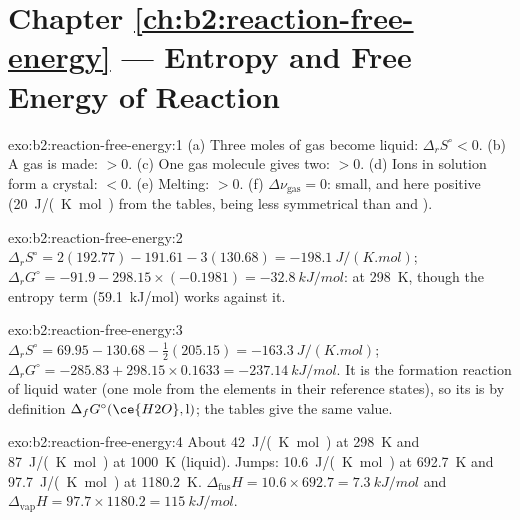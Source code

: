 \section*{Chapter \ref{ch:b2:reaction-free-energy} --- Entropy and Free Energy of Reaction}

\begin{solution}{exo:b2:reaction-free-energy:1}
(a) Three moles of gas become liquid: $\Delta_r S^\circ < 0$. (b) A gas is
made: $> 0$. (c) One gas molecule gives two: $> 0$. (d) Ions in solution
form a crystal: $< 0$. (e) Melting: $> 0$. (f) $\Delta\nu_{\text{gas}} = 0$:
small, and here positive (\qty{+20}{J/(K.mol)} from the tables, 
being less symmetrical than  and ).
\end{solution}

\begin{solution}{exo:b2:reaction-free-energy:2}
$\Delta_r S^\circ = 2(192.77) - 191.61 - 3(130.68) = \qty{-198.1}{J/(K.mol)}$;
$\Delta_r G^\circ = -91.9 - 298.15 \times (-0.1981) = \qty{-32.8}{kJ/mol}$:
 at \qty{298}{K}, though the entropy term (\qty{+59.1}{kJ/mol})
works against it.
\end{solution}

\begin{solution}{exo:b2:reaction-free-energy:3}
$\Delta_r S^\circ = 69.95 - 130.68 - \tfrac12(205.15) = \qty{-163.3}{J/(K.mol)}$;
$\Delta_r G^\circ = -285.83 + 298.15 \times 0.1633 = \qty{-237.14}{kJ/mol}$.
It is the formation reaction of liquid water (one mole from the elements in
their reference states), so its  is by
definition $\Delta_f G^\circ(\ce{H2O}, \text{l})$; the tables give the same
value.
\end{solution}

\begin{solution}{exo:b2:reaction-free-energy:4}
About \qty{42}{J/(K.mol)} at \qty{298}{K} and \qty{87}{J/(K.mol)} at
\qty{1000}{K} (liquid). Jumps: \qty{10.6}{J/(K.mol)} at \qty{692.7}{K} and
\qty{97.7}{J/(K.mol)} at \qty{1180.2}{K}. $\Delta_{\text{fus}}H = 10.6 \times
692.7 = \qty{7.3}{kJ/mol}$ and $\Delta_{\text{vap}}H = 97.7 \times 1180.2 =
\qty{115}{kJ/mol}$.
\end{solution}

